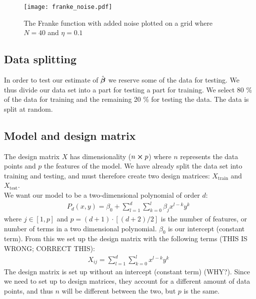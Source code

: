         \begin{figure}
            \texttt{[image: franke\_noise.pdf]}
            \caption{The Franke function with added noise plotted on a grid where $N=40$ and $\eta=0.1$}
            \label{fig:franke_function_noise}
        \end{figure}

    \subsection{Data splitting}\label{sec:splitting}
        In order to test our estimate of $\hat{\boldsymbol{\beta}}$ we reserve some of the data for testing. We thus divide our data set into a part for testing a part for training. We select 80 \% of the data for training and the remaining 20 \% for testing the data. The data is split at random. 

    \subsection{Model and design matrix}\label{sec:model}
        The design matrix $X$ has dimensionality ($n\cross p$) where $n$ represents the data points and $p$ the features of the model. We have already split the data set into training and testing, and must therefore create two design matrices: $X_{\text{train}}$ and $X_{\text{test}}$. 
        \\
        We want our model to be a two-dimensional polynomial of order $d$:
        \begin{align*}
            P_d(x,y) = \beta_0 + \sum_{l=1}^d\sum_{k=0}^{l} \beta_jx^{l-k}y^k
        \end{align*}
        where $j\in[1,p]$ and $p=(d+1)\cdot\left[(d+2)/2\right]$ is the number of features, or number of terms in a two dimensional polynomial. $\beta_0$ is our intercept (constant term). From this we set up the design matrix with the following terms (THIS IS WRONG; CORRECT THIS):
        \begin{align}\label{eq:designmatrixequation}
            X_{ij} = \sum_{l=1}^d\sum_{k=0}^{l} x^{l-k}y^k
        \end{align}
        The design matrix is set up without an intercept (constant term) (WHY?). Since we need to set up to design matrices, they account for a different amount of data points, and thus $n$ will be different between the two, but $p$ is the same. 
